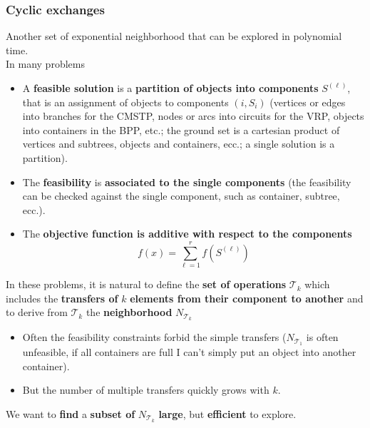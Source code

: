\documentclass[11pt]{article}
\begin{document}
	\newpage
	
	\subsubsection{Cyclic exchanges}
	Another set of exponential neighborhood that can be explored in polynomial time.\\
	
	In many problems
	\begin{itemize}
		\item A \textbf{feasible solution} is a \textbf{partition of objects into components} $S^{(\ell)}$, that is an assignment of objects to components $(i, S_i )$ (vertices or edges into branches for the CMSTP, nodes or arcs into circuits for the VRP, objects into containers in the BPP, etc.; the ground set is a cartesian product of vertices and subtrees, objects and containers, ecc.; a single solution is a partition).\\
		
		\item The \textbf{feasibility} is \textbf{associated to the single components} (the feasibility can be checked against the single component, such as container, subtree, ecc.).\\
		
		\item The \textbf{objective function is additive with respect to the components}
		$$ f (x) = \sum_{\ell = 1}^{r} f \left(S^{(\ell)} \right)$$
	\end{itemize}
	
	In these problems, it is natural to define the \textbf{set of operations} $\mathcal{T}_k$ which includes the \textbf{transfers of} $k$ \textbf{elements from their component to another} and to derive from $\mathcal{T}_k$ the \textbf{neighborhood} $N_{\mathcal{T}_k}$
	\begin{itemize}
		\item Often the feasibility constraints forbid the simple transfers ($N_{\mathcal{T}_1}$ is often unfeasible, if all containers are full I can't simply put an object into another container).\\
		
		\item But the number of multiple transfers quickly grows with $k$.\\
	\end{itemize}
	We want to \textbf{find} a \textbf{subset of} $N_{\mathcal{T}_k}$ \textbf{large}, but \textbf{efficient} to explore.\\
	
\end{document}
